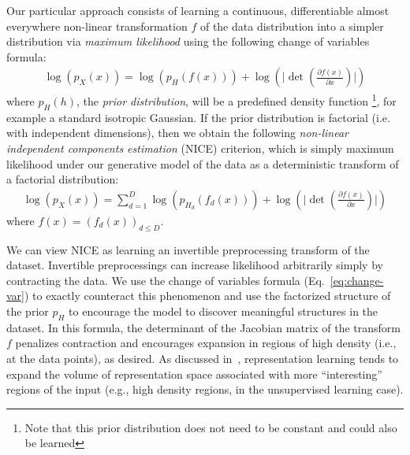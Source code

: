 \documentclass{article}
\def\D{{\mathcal{D}}}
\begin{document}
Our particular approach consists of learning a continuous, differentiable
almost everywhere non-linear transformation $f$ of the data distribution
into a simpler distribution via {\em maximum likelihood}
using the following change of variables formula:
\begin{align*}
\log(p_X(x)) = \log(p_H(f(x))) +
\log(\lvert \det(\frac{\partial f(x)}{\partial x}) \rvert)
\end{align*}
where $p_H(h)$, the \textit{prior distribution},
will be a predefined density function
\footnote{Note that this prior distribution
does not need to be constant and could also be learned}, 
for example a
standard isotropic Gaussian.
If the prior distribution is factorial (i.e. with independent dimensions), then we obtain the following
\textit{non-linear independent components estimation} (NICE) criterion, which is simply maximum likelihood under our generative model of the data as a deterministic transform of a factorial distribution:
\begin{align*}
\log(p_X(x)) = \sum_{d=1}^{D}{\log(p_{H_{d}}(f_{d}(x)))} + \log(\lvert \det(\frac{\partial f(x)}{\partial x}) \rvert)
\end{align*}
where $f(x) = (f_{d}(x))_{d \leq D}$.

We can view NICE as learning an invertible preprocessing transform of the dataset.
Invertible preprocessings can increase likelihood arbitrarily simply 
by contracting the data.  We use the change of variables formula 
(Eq.~\ref{eq:change-var}) to exactly counteract this phenomenon and use
the factorized structure of the prior $p_H$ to encourage 
the model to discover meaningful structures in the dataset.
In this formula, the determinant of the Jacobian matrix of the transform 
$f$ penalizes contraction and encourages expansion in regions of high density
(i.e., at the data points), as desired.  As discussed in~\citet{Bengio-et-al-ICML2013},
representation learning tends to expand the volume of representation space associated
with more ``interesting'' regions of the input (e.g., high density regions,
in the unsupervised learning case).

\end{document}
